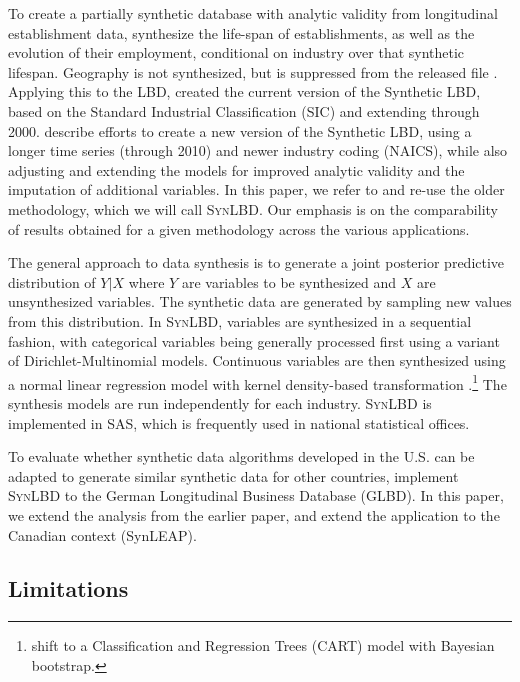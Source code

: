 \documentclass[10pt]{article}
\newcommand{\SynLBD}{\textsc{SynLBD}}
\begin{document}
To create a partially synthetic database with analytic validity from longitudinal establishment data, \citet{RePEc:cen:tnotes:11-01} synthesize the life-span of establishments, as well as the evolution of their employment, conditional on industry over that synthetic lifespan. Geography is not synthesized, but is suppressed from the released file \citep{RePEc:cen:tnotes:11-01}. Applying this to the \ac{LBD}, \citet{KinneyEtAl2011}  created the current version of the Synthetic LBD,  based on the Standard Industrial Classification (SIC) and extending through 2000. \citet{RePEc:cen:wpaper:14-12} describe efforts to create a new version of the Synthetic LBD, using a longer time  series (through 2010) and newer industry coding (NAICS), while also adjusting and extending the models for  improved  analytic validity and  the imputation of additional variables. In this paper, we refer to and re-use the older methodology, which we will call \SynLBD. Our emphasis is on the comparability of results obtained for a given methodology across the various applications.
  

The general approach to data synthesis is to generate a joint posterior predictive distribution of $Y|X$ where $Y$ are variables to be synthesized and $X$ are unsynthesized variables. The synthetic data are generated by sampling new values from this distribution. In \SynLBD, variables are synthesized in a sequential fashion, with categorical variables being generally processed first using a variant of Dirichlet-Multinomial models. Continuous variables are then synthesized using a normal linear regression model with kernel density-based transformation \citep{WOODCOCK20094228}.\footnote{\textcite{RePEc:cen:wpaper:14-12} shift  to a Classification and Regression Trees (CART) model with Bayesian bootstrap. } The synthesis models are run independently for each industry. \SynLBD{} is implemented in SAS\texttrademark, which is frequently used in national statistical offices.

To evaluate whether synthetic data algorithms developed in the U.S. can be adapted to generate similar synthetic data for other countries, \textcite{RePEc:cen:wpaper:14-13} implement \SynLBD{} to the German Longitudinal Business Database (GLBD). In this paper, we extend the analysis from the earlier paper, and extend the application to the Canadian context (SynLEAP). 

\subsection{Limitations}
\end{document}
